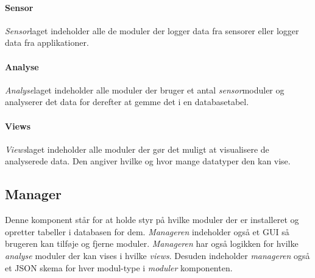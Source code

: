 \paragraph{Sensor} \textit{Sensor}laget indeholder alle de moduler der logger data fra sensorer eller logger data fra applikationer.

\paragraph{Analyse}
\textit{Analyse}laget indeholder alle moduler der bruger et antal \textit{sensor}moduler og analyserer det data for derefter at gemme det i en databasetabel.

\paragraph{Views}
\textit{Views}laget indeholder alle moduler der gør det muligt at visualisere de analyserede data.
Den angiver hvilke og hvor mange datatyper den kan vise.

\subsection*{Manager}
Denne komponent står for at holde styr på hvilke moduler der er installeret og opretter tabeller i databasen for dem.
\textit{Manageren} indeholder også et GUI så brugeren kan tilføje og fjerne moduler.
\textit{Manageren} har også logikken for hvilke \textit{analyse} moduler der kan vises i hvilke \textit{views}.
Desuden indeholder \textit{manageren} også et JSON skema for hver modul-type i \textit{moduler} komponenten.
